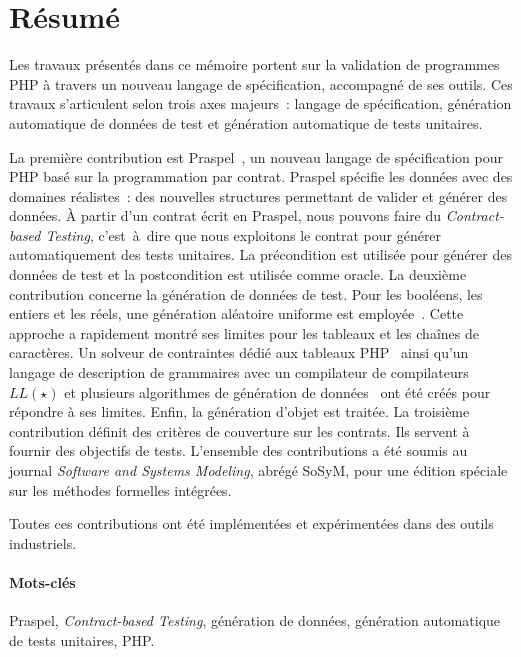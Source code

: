 \documentclass[a4paper,11pt]{article}
\newcommand{\inenglish}[1]{\foreignlanguage{english}{\em #1}}
\newcommand{\acite}[1]{\citep{#1}}
\begin{document}
\section*{Résumé}

Les travaux présentés dans ce mémoire portent sur la validation de programmes
PHP à travers un nouveau langage de spécification, accompagné de ses outils. Ces
travaux s'articulent selon trois axes majeurs~: langage de spécification,
génération automatique de données de test et génération automatique de tests
unitaires.

La première contribution est Praspel~\acite{EnderlinDGO11}, un nouveau langage
de spécification pour PHP basé sur la programmation par contrat. Praspel
spécifie les données avec des domaines réalistes~: des nouvelles structures
permettant de valider et générer des données. À partir d'un contrat écrit en
Praspel, nous pouvons faire du \inenglish{Contract-based Testing}, c'est~à~dire
que nous exploitons le contrat pour générer automatiquement des tests unitaires.
La précondition est utilisée pour générer des données de test et la
postcondition est utilisée comme oracle. La deuxième contribution concerne la
génération de données de test. Pour les booléens, les entiers et les réels, une
génération aléatoire uniforme est employée~\acite{EnderlinDGO11}. Cette approche
a rapidement montré ses limites pour les tableaux et les chaînes de caractères.
Un solveur de contraintes dédié aux tableaux PHP~\acite{EnderlinGB13} ainsi
qu'un langage de description de grammaires avec un compilateur de compilateurs
$LL(\star)$ et plusieurs algorithmes de génération de
données~\acite{EnderlinDGB12} ont été créés pour répondre à ses limites. Enfin,
la génération d'objet est traitée. La troisième contribution définit des
critères de couverture sur les contrats. Ils servent à fournir des objectifs de
tests. L'ensemble des contributions a été soumis au journal \inenglish{Software
and Systems Modeling}, abrégé SoSyM, pour une édition spéciale sur les méthodes
formelles intégrées.

Toutes ces contributions ont été implémentées et expérimentées dans des outils
industriels.

\paragraph{Mots-clés} Praspel, \inenglish{Contract-based Testing}, géné\-ration
de données, géné\-ration automatique de tests unitaires, PHP.



\end{document}
